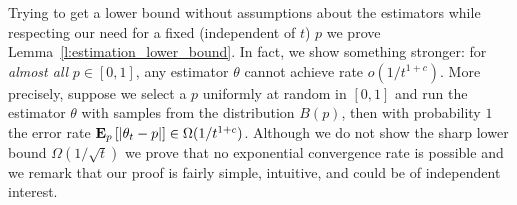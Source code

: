 Trying to get a lower bound without assumptions about the estimators
while respecting our need for a fixed (independent of $t$) $p$ we prove
Lemma~\ref{l:estimation_lower_bound}.
In fact, we show something stronger:
for \emph{almost all} $p \in [0,1]$, any estimator $\theta$ cannot
achieve rate $o(1/t^{1+c})$.
More precisely,  suppose we select a $p$ uniformly at
random in $[0,1]$ and run the estimator $\theta$ with samples from the
distribution $B(p)$, then with probability $1$ the error rate $\bm{\mathrm{E}}_{p} \left[ |\theta_t  - p | \right] \in
\Omega(1/t^{1+c})$. Although we do not show the sharp lower bound
$\Omega(1/\sqrt{t})$ we prove that no exponential convergence rate
is possible and we remark that our proof is fairly simple, intuitive,
and could be of independent interest.
%

